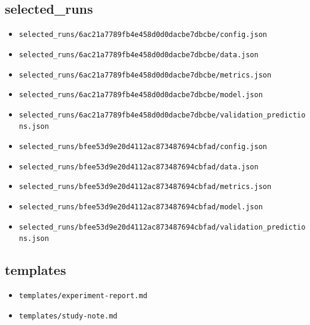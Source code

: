 \documentclass[UTF8,zihao=-4,fontset=fandol]{ctexart}
\begin{document}
\subsection{selected\_runs}
\begin{itemize}
\item \nolinkurl{selected_runs/6ac21a7789fb4e458d0d0dacbe7dbcbe/config.json}
\item \nolinkurl{selected_runs/6ac21a7789fb4e458d0d0dacbe7dbcbe/data.json}
\item \nolinkurl{selected_runs/6ac21a7789fb4e458d0d0dacbe7dbcbe/metrics.json}
\item \nolinkurl{selected_runs/6ac21a7789fb4e458d0d0dacbe7dbcbe/model.json}
\item \nolinkurl{selected_runs/6ac21a7789fb4e458d0d0dacbe7dbcbe/validation_predictions.json}
\item \nolinkurl{selected_runs/bfee53d9e20d4112ac873487694cbfad/config.json}
\item \nolinkurl{selected_runs/bfee53d9e20d4112ac873487694cbfad/data.json}
\item \nolinkurl{selected_runs/bfee53d9e20d4112ac873487694cbfad/metrics.json}
\item \nolinkurl{selected_runs/bfee53d9e20d4112ac873487694cbfad/model.json}
\item \nolinkurl{selected_runs/bfee53d9e20d4112ac873487694cbfad/validation_predictions.json}
\end{itemize}

\subsection{templates}
\begin{itemize}
\item \nolinkurl{templates/experiment-report.md}
\item \nolinkurl{templates/study-note.md}
\end{itemize}
\end{document}
